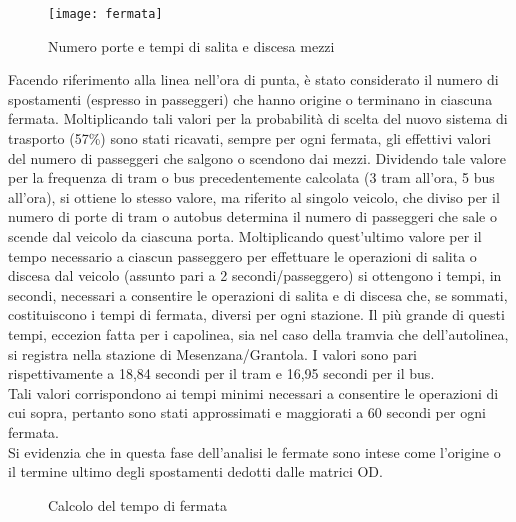 \documentclass{article}
\begin{document}
\begin{figure}[H]
\centering
\texttt{[image: fermata]}
\caption{Numero porte e tempi di salita e discesa mezzi}
\end{figure}
Facendo riferimento alla linea nell’ora di punta, è stato considerato il numero di spostamenti (espresso in passeggeri) che hanno origine o terminano in ciascuna fermata. Moltiplicando tali valori per la probabilità di scelta del nuovo sistema di trasporto (57\%) sono stati ricavati, sempre per ogni fermata, gli effettivi valori del numero di passeggeri che salgono o scendono dai mezzi. Dividendo tale valore per la frequenza di tram o bus precedentemente calcolata (3 tram all’ora, 5 bus all’ora), si ottiene lo stesso valore, ma riferito al singolo veicolo, che diviso per il numero di porte di tram o autobus determina il numero di passeggeri che sale o scende dal veicolo da ciascuna porta. Moltiplicando quest’ultimo valore per il tempo necessario a ciascun passeggero per effettuare le operazioni di salita o discesa dal veicolo (assunto pari a 2 secondi/passeggero) si ottengono i tempi, in secondi, necessari a consentire le operazioni di salita e di discesa che, se sommati, costituiscono i tempi di fermata, diversi per ogni stazione. Il più grande di questi tempi, eccezion fatta per i capolinea, sia nel caso della tramvia che dell’autolinea, si registra nella stazione di Mesenzana/Grantola. I valori sono pari rispettivamente a 18,84 secondi per il tram e 16,95 secondi per il bus.\\
Tali valori corrispondono ai tempi minimi necessari a consentire le operazioni di cui sopra, pertanto sono stati approssimati e maggiorati a 60 secondi per ogni fermata.\\ 
Si evidenzia che in questa fase dell’analisi le fermate sono intese come l’origine o il termine ultimo degli spostamenti dedotti dalle matrici OD. 
\begin{figure}[H]
\centering
{}
\qquad
{}
\qquad
{}
\qquad
{}
\qquad
{}
\caption{Calcolo del tempo di fermata}
\end{figure}
\end{document}
